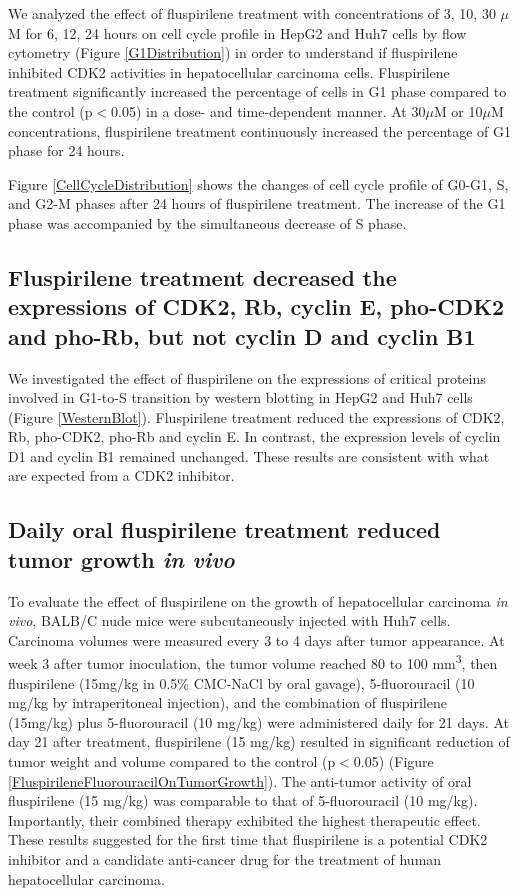 \documentclass[10pt]{article}
\begin{document}
We analyzed the effect of fluspirilene treatment with concentrations of 3, 10, 30 $\mu$M for 6, 12, 24 hours on cell cycle profile in HepG2 and Huh7 cells by flow cytometry (Figure \ref{G1Distribution}) in order to understand if fluspirilene inhibited CDK2 activities in hepatocellular carcinoma cells. Fluspirilene treatment significantly increased the percentage of cells in G1 phase compared to the control (p$<$0.05) in a dose- and time-dependent manner. At 30$\mu$M or 10$\mu$M concentrations, fluspirilene treatment continuously increased the percentage of G1 phase for 24 hours.

Figure \ref{CellCycleDistribution} shows the changes of cell cycle profile of G0-G1, S, and G2-M phases after 24 hours of fluspirilene treatment. The increase of the G1 phase was accompanied by the simultaneous decrease of S phase.

\subsection*{Fluspirilene treatment decreased the expressions of CDK2, Rb, cyclin E, pho-CDK2 and pho-Rb, but not cyclin D and cyclin B1}

We investigated the effect of fluspirilene on the expressions of critical proteins involved in G1-to-S transition by western blotting in HepG2 and Huh7 cells (Figure \ref{WesternBlot}). Fluspirilene treatment reduced the expressions of CDK2, Rb, pho-CDK2, pho-Rb and cyclin E. In contrast, the expression levels of cyclin D1 and cyclin B1 remained unchanged. These results are consistent with what are expected from a CDK2 inhibitor.

\subsection*{Daily oral fluspirilene treatment reduced tumor growth \textit{in vivo}}

To evaluate the effect of fluspirilene on the growth of hepatocellular carcinoma \textit{in vivo}, BALB/C nude mice were subcutaneously injected with Huh7 cells. Carcinoma volumes were measured every 3 to 4 days after tumor appearance. At week 3 after tumor inoculation, the tumor volume reached 80 to 100 mm\textsuperscript{3}, then fluspirilene (15mg/kg in 0.5\% CMC-NaCl by oral gavage), 5-fluorouracil (10 mg/kg by intraperitoneal injection), and the combination of fluspirilene (15mg/kg) plus 5-fluorouracil (10 mg/kg) were administered daily for 21 days. At day 21 after treatment, fluspirilene (15 mg/kg) resulted in significant reduction of tumor weight and volume compared to the control (p$<$0.05) (Figure \ref{FluspirileneFluorouracilOnTumorGrowth}). The anti-tumor activity of oral fluspirilene (15 mg/kg) was comparable to that of 5-fluorouracil (10 mg/kg). Importantly, their combined therapy exhibited the highest therapeutic effect. These results suggested for the first time that fluspirilene is a potential CDK2 inhibitor and a candidate anti-cancer drug for the treatment of human hepatocellular carcinoma.
\end{document}
